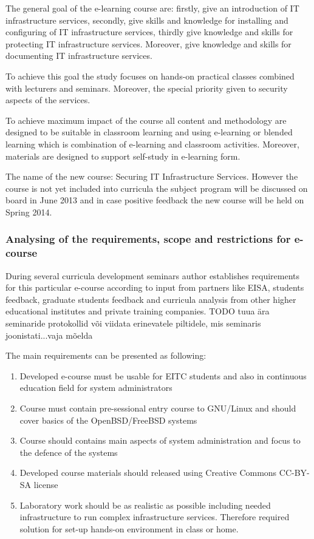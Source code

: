 The general goal of the e-learning course are: firstly, give an introduction of IT infrastructure services, secondly, give skills and knowledge for installing and configuring of IT infrastructure services, thirdly give knowledge and skills for protecting IT infrastructure services. Moreover, give knowledge and skills for documenting IT infrastructure services.


To achieve this goal the study focuses on hands-on practical classes combined with lecturers and seminars. Moreover, the special priority given to security aspects of the services.

To achieve maximum impact of the course all content and methodology are designed to be suitable in classroom learning and using e-learning or blended learning which is combination of e-learning and classroom activities. Moreover, materials are designed to support self-study in e-learning form.

The name of the new course: Securing IT Infrastructure Services. However the course is not yet included into curricula the subject program will be discussed on board in June 2013 and in case positive feedback the new course will be held on Spring 2014.



\subsubsection{Analysing of the requirements, scope and restrictions for e-course}
During several curricula development seminars author establishes requirements for this particular e-course according to input from partners like \gls{EISA}, students feedback, graduate students feedback and curricula analysis from other higher educational institutes and private training companies. {\color{red} TODO tuua ära seminaride protokollid või viidata erinevatele piltidele, mis seminaris joonistati...vaja mõelda}


The main requirements can be presented as following:

\begin{enumerate}[label=Requirement \arabic*.,leftmargin=*]
  \item Developed e-course must be usable for \gls{EITC} students and also in continuous education field for system administrators
  \item Course must contain pre-sessional entry course to GNU/Linux and should cover basics  of the OpenBSD/FreeBSD systems
  \item Course should contains main aspects of system administration and focus to the defence of the systems
  \item Developed course materials should released using Creative Commons \gls{CC-BY-SA} license
  \item Laboratory work should be as realistic as possible including needed infrastructure to run complex infrastructure services. Therefore required solution for set-up hands-on environment in class or home.
\end{enumerate}


